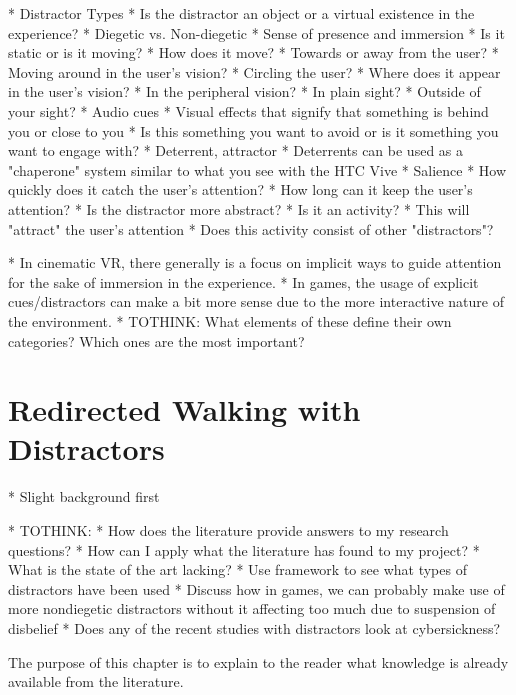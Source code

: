    * Distractor Types
      * Is the distractor an object or a virtual existence in the experience?
         * Diegetic vs. Non-diegetic
            * Sense of presence and immersion
         * Is it static or is it moving?
             * How does it move? 
                * Towards or away from the user?
                * Moving around in the user's vision?
                * Circling the user?
         * Where does it appear in the user's vision?
            * In the peripheral vision?
            * In plain sight?
            * Outside of your sight?
               * Audio cues
               * Visual effects that signify that something is behind you or close to you
         * Is this something you want to avoid or is it something you want to engage with?
            * Deterrent, attractor
            * Deterrents can be used as a "chaperone" system similar to what you see with the HTC Vive
         * Salience
            * How quickly does it catch the user's attention?
            * How long can it keep the user's attention?
      * Is the distractor more abstract?
         * Is it an activity?
            * This will "attract" the user's attention
         * Does this activity consist of other "distractors"?
      
* In cinematic VR, there generally is a focus on implicit ways to guide attention for the sake of immersion in the experience.
* In games, the usage of explicit cues/distractors can make a bit more sense due to the more interactive nature of the environment. 
* TOTHINK: What elements of these define their own categories? Which ones are the most important?


\section{Redirected Walking with Distractors}
* Slight background first

* TOTHINK:
    * How does the literature provide answers to my research questions?
    * How can I apply what the literature has found to my project?
    * What is the state of the art lacking?
    * Use framework to see what types of distractors have been used
       * Discuss how in games, we can probably make use of more nondiegetic distractors without it affecting too much due to suspension of disbelief
    * Does any of the recent studies with distractors look at cybersickness?


The purpose of this chapter
is to explain to the reader what knowledge is already
available from the literature.


